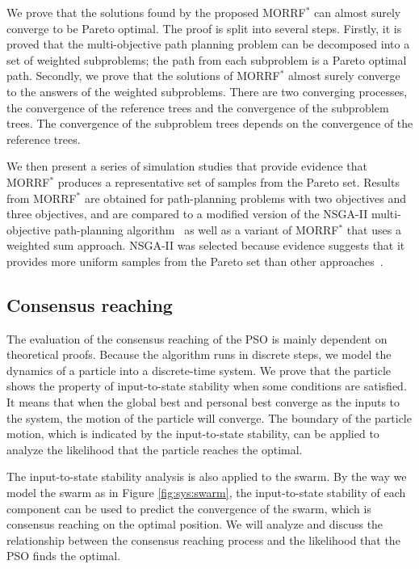\documentclass[phd]{byuprop}
\begin{document}
We prove that the solutions found by the proposed MORRF$^{*}$ can almost surely converge to be Pareto optimal.
The proof is split into several steps.
Firstly, it is proved that the multi-objective path planning problem can be decomposed into a set of weighted subproblems;
the path from each subproblem is a Pareto optimal path.
Secondly, we prove that the solutions of MORRF$^{*}$ almost surely converge to the answers of the weighted subproblems.
There are two converging processes, the convergence of the reference trees and the convergence of the subproblem trees.
The convergence of the subproblem trees depends on the convergence of the reference trees.

We then present a series of simulation studies that provide evidence that MORRF$^{*}$ produces a representative set of samples from the Pareto set.
Results from MORRF$^{*}$ are obtained for path-planning problems with two objectives and three objectives, and are compared to a modified version of the NSGA-II multi-objective path-planning algorithm~\cite{Ahmed2013} as well as a variant of MORRF$^{*}$ that uses a weighted sum approach.
NSGA-II was selected because evidence suggests that it provides more uniform samples from the Pareto set than other approaches~\cite{Deb2002}.  

\subsection{Consensus reaching}

The evaluation of the consensus reaching of the PSO is mainly dependent on theoretical proofs.
Because the algorithm runs in discrete steps, we model the dynamics of a particle into a discrete-time system.
We prove that the particle shows the property of input-to-state stability when some conditions are satisfied.
It means that when the global best and personal best converge as the inputs to the system, the motion of the particle will converge.
The boundary of the particle motion, which is indicated by the input-to-state stability, can be applied to analyze the likelihood that the particle reaches the optimal.

The input-to-state stability analysis is also applied to the swarm.
By the way we model the swarm as in Figure \ref{fig:sys:swarm}, the input-to-state stability of each component can be used to predict the convergence of the swarm, which is consensus reaching on the optimal position.
We will analyze and discuss the relationship between the consensus reaching process and the likelihood that the PSO finds the optimal.
\end{document}
